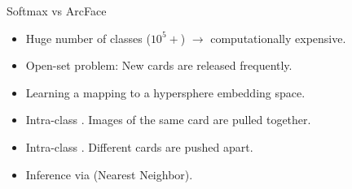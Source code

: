 \documentclass[aspectratio=169, 9pt, t, notheorems, mathserif]{beamer}
\begin{document}
\begin{frame}{Softmax vs ArcFace}
    \begin{itemize}
        \item Huge number of classes ($10^5+$) $\rightarrow$ computationally expensive.
        \item Open-set problem: New cards are released frequently.
    \end{itemize}
    
    \vspace{0.5cm}
    
    \begin{itemize}
        \item Learning a mapping to a hypersphere embedding space.
        \item Intra-class . Images of the same card are pulled together.
        \item Intra-class . Different cards are pushed apart.
        \item Inference via  (Nearest Neighbor).
    \end{itemize}
\end{frame}
\end{document}
